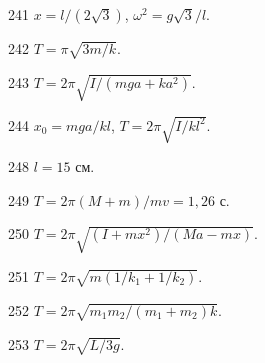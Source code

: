 \begin{Answer}{241}
$x = l/(2\sqrt{3})$, $\omega^2 = g\sqrt{3} / l$.
\end{Answer}
\begin{Answer}{242}
$T =  \pi\sqrt{3m/k}$.
\end{Answer}
\begin{Answer}{243}
$T = 2 \pi \sqrt{I/(mga + ka^2)}$.
\end{Answer}
\begin{Answer}{244}
$x_0 = mga/kl$, $T = 2 \pi \sqrt{I/kl^2}$.
\end{Answer}
\begin{Answer}{248}
$l = 15$ см.
\end{Answer}
\begin{Answer}{249}
$T = 2 \pi (M+m) / mv = 1,26$ с.
\end{Answer}
\begin{Answer}{250}
$T = 2 \pi \sqrt{(I+mx^2)/(Ma - mx)}$.
\end{Answer}
\begin{Answer}{251}
$T = 2 \pi \sqrt{m(1/k_1 + 1/k_2)}$.
\end{Answer}
\begin{Answer}{252}
$T = 2 \pi \sqrt{m_1m_2/(m_1 + m_2)k}$.
\end{Answer}
\begin{Answer}{253}
$T = 2 \pi \sqrt{L/3g}$.
\end{Answer}
